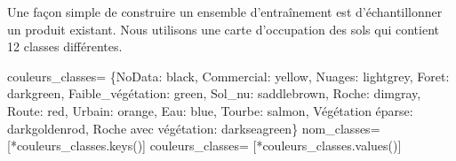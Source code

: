 \documentclass[
  11pt,
  letterpaper,
  open=any,
  twoside=false,
  french]{scrbook}
\newenvironment{Shaded}{\begin{snugshade}}{\end{snugshade}}
\newcommand{\NormalTok}[1]{\textcolor[rgb]{0.00,0.23,0.31}{#1}}
\newcommand{\OperatorTok}[1]{\textcolor[rgb]{0.37,0.37,0.37}{#1}}
\newcommand{\StringTok}[1]{\textcolor[rgb]{0.13,0.47,0.30}{#1}}
\begin{document}
Une façon simple de construire un ensemble d'entraînement est
d'échantillonner un produit existant. Nous utilisons une carte
d'occupation des sols qui contient 12 classes différentes.

\begin{Shaded}
\begin{Highlighting}[]
\NormalTok{couleurs\_classes}\OperatorTok{=}\NormalTok{ \{}\StringTok{\textquotesingle{}NoData\textquotesingle{}}\NormalTok{: }\StringTok{\textquotesingle{}black\textquotesingle{}}\NormalTok{, }\StringTok{\textquotesingle{}Commercial\textquotesingle{}}\NormalTok{: }\StringTok{\textquotesingle{}yellow\textquotesingle{}}\NormalTok{, }\StringTok{\textquotesingle{}Nuages\textquotesingle{}}\NormalTok{: }\StringTok{\textquotesingle{}lightgrey\textquotesingle{}}\NormalTok{, }
                    \StringTok{\textquotesingle{}Foret\textquotesingle{}}\NormalTok{: }\StringTok{\textquotesingle{}darkgreen\textquotesingle{}}\NormalTok{, }\StringTok{\textquotesingle{}Faible\_végétation\textquotesingle{}}\NormalTok{: }\StringTok{\textquotesingle{}green\textquotesingle{}}\NormalTok{, }\StringTok{\textquotesingle{}Sol\_nu\textquotesingle{}}\NormalTok{: }\StringTok{\textquotesingle{}saddlebrown\textquotesingle{}}\NormalTok{,}
                  \StringTok{\textquotesingle{}Roche\textquotesingle{}}\NormalTok{: }\StringTok{\textquotesingle{}dimgray\textquotesingle{}}\NormalTok{, }\StringTok{\textquotesingle{}Route\textquotesingle{}}\NormalTok{: }\StringTok{\textquotesingle{}red\textquotesingle{}}\NormalTok{, }\StringTok{\textquotesingle{}Urbain\textquotesingle{}}\NormalTok{: }\StringTok{\textquotesingle{}orange\textquotesingle{}}\NormalTok{, }\StringTok{\textquotesingle{}Eau\textquotesingle{}}\NormalTok{: }\StringTok{\textquotesingle{}blue\textquotesingle{}}\NormalTok{, }\StringTok{\textquotesingle{}Tourbe\textquotesingle{}}\NormalTok{: }\StringTok{\textquotesingle{}salmon\textquotesingle{}}\NormalTok{, }\StringTok{\textquotesingle{}Végétation éparse\textquotesingle{}}\NormalTok{: }\StringTok{\textquotesingle{}darkgoldenrod\textquotesingle{}}\NormalTok{, }\StringTok{\textquotesingle{}Roche avec végétation\textquotesingle{}}\NormalTok{: }\StringTok{\textquotesingle{}darkseagreen\textquotesingle{}}\NormalTok{\}}
\NormalTok{nom\_classes}\OperatorTok{=}\NormalTok{ [}\OperatorTok{*}\NormalTok{couleurs\_classes.keys()]}
\NormalTok{couleurs\_classes}\OperatorTok{=}\NormalTok{ [}\OperatorTok{*}\NormalTok{couleurs\_classes.values()]}
\end{Highlighting}
\end{Shaded}
\end{document}
